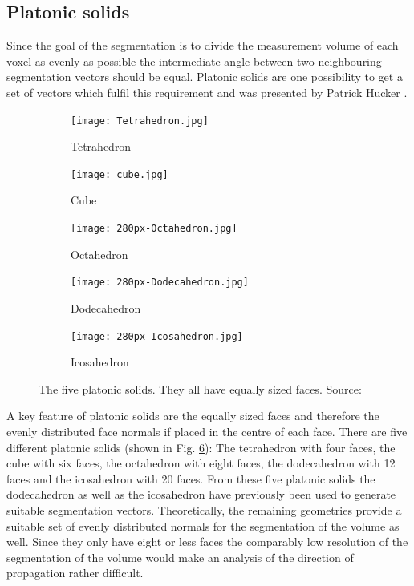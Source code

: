 \subsection{Platonic solids}
\label{chap:platonicsolids}

Since the goal of the segmentation is to divide the measurement volume of each voxel as evenly as possible the intermediate angle between two neighbouring segmentation vectors should be equal. Platonic solids are one possibility to get a set of vectors which fulfil this requirement and was presented by Patrick Hucker \cite{PatrickHucker2014EvaluationRuckstreumodells}.
\begin{figure}[H]
     \centering
     \begin{subfigure}[b]{0.19\textwidth}
         \centering
        \texttt{[image: Tetrahedron.jpg]}
         \caption{Tetrahedron}
         \label{fig:Tetrahedron}
     \end{subfigure}
     \hfill
     \begin{subfigure}[b]{0.19\textwidth}
         \centering
         \texttt{[image: cube.jpg]}
         \caption{Cube}
         \label{fig:cube}
     \end{subfigure}
     \hfill
     \begin{subfigure}[b]{0.19\textwidth}
         \centering
         \texttt{[image: 280px-Octahedron.jpg]}
         \caption{Octahedron}
         \label{fig:Octahedron}
     \end{subfigure}
     \hfill
     \begin{subfigure}[b]{0.19\textwidth}
         \centering
         \texttt{[image: 280px-Dodecahedron.jpg]}
         \caption{Dodecahedron}
         \label{fig:Dodecahedron}
     \end{subfigure}
     \hfill
     \begin{subfigure}[b]{0.19\textwidth}
         \centering
         \texttt{[image: 280px-Icosahedron.jpg]}
         \caption{Icosahedron}
         \label{fig:Icosahedro}
     \end{subfigure}
        \caption{The five platonic solids. They all have equally sized faces. Source: \cite{wiki_platonic}}
        \label{fig:platonic_solids}
\end{figure}

A key feature of platonic solids are the equally sized faces and therefore the evenly distributed face normals if placed in the centre of each face.
There are five different platonic solids (shown in Fig. \ref{fig:platonic_solids}): The tetrahedron with four faces, the cube with six faces, the octahedron with eight faces, the dodecahedron with 12 faces and the icosahedron with 20 faces.
From these five platonic solids the dodecahedron as well as the icosahedron have previously been used to generate suitable segmentation vectors. Theoretically, the remaining geometries provide a suitable set of evenly distributed normals for the segmentation of the volume as well. Since they only have eight or less faces the comparably low resolution of the segmentation of the volume would make an analysis of the direction of propagation rather difficult.

